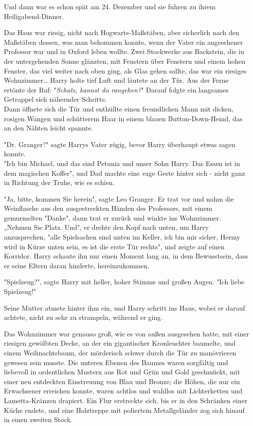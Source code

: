 {Und dann war es schon spät am 24. Dezember und sie fuhren zu ihrem Heiligabend-Dinner.

Das Haus war riesig, nicht nach Hogwarts-Maßstäben, aber sicherlich nach den Maßstäben dessen, was man bekommen konnte, wenn der Vater ein angesehener Professor war und in Oxford leben wollte. Zwei Stockwerke aus Backstein, die in der untergehenden Sonne glänzten, mit Fenstern über Fenstern und einem hohen Fenster, das viel weiter nach oben ging, als Glas gehen sollte, das war ein riesiges Wohnzimmer… Harry holte tief Luft und läutete an der Tür. Aus der Ferne ertönte der Ruf: "\emph{Schatz, kannst du rangehen?}" Darauf folgte ein langsames Getrappel sich nähernder Schritte.\\ Dann öffnete sich die Tür und enthüllte einen freundlichen Mann mit dicken, rosigen Wangen und schütterem Haar in einem blauen Button-Down-Hemd, das an den Nähten leicht spannte.

"Dr. Granger?" sagte Harrys Vater zügig, bevor Harry überhaupt etwas sagen konnte.\\ "Ich bin Michael, und das sind Petunia und unser Sohn Harry. Das Essen ist in dem magischen Koffer", und Dad machte eine vage Geste hinter sich - nicht ganz in Richtung der Truhe, wie es schien.

"Ja, bitte, kommen Sie herein", sagte Leo Granger. Er trat vor und nahm die Weinflasche aus den ausgestreckten Händen des Professors, mit einem gemurmelten "Danke", dann trat er zurück und winkte ins Wohnzimmer. „Nehmen Sie Platz. Und", er drehte den Kopf nach unten, um Harry anzusprechen, "alle Spielsachen sind unten im Keller, ich bin mir sicher, Hermy wird in Kürze unten sein, es ist die erste Tür rechts", und zeigte auf einen Korridor. Harry schaute ihn nur einen Moment lang an, in dem Bewusstsein, dass er seine Eltern daran hinderte, hereinzukommen.

"Spielzeug?", sagte Harry mit heller, hoher Stimme und großen Augen. "Ich liebe Spielzeug!"

Seine Mutter atmete hinter ihm ein, und Harry schritt ins Haus, wobei er darauf achtete, nicht zu sehr zu strampeln, während er ging.

Das Wohnzimmer war genauso groß, wie es von außen ausgesehen hatte, mit einer riesigen gewölbten Decke, an der ein gigantischer Kronleuchter baumelte, und einem Weihnachtsbaum, der mörderisch schwer durch die Tür zu manövrieren gewesen sein musste. Die unteren Ebenen des Baumes waren sorgfältig und liebevoll in ordentlichen Mustern aus Rot und Grün und Gold geschmückt, mit einer neu entdeckten Einstreuung von Blau und Bronze; die Höhen, die nur ein Erwachsener erreichen konnte, waren achtlos und wahllos mit Lichterketten und Lametta-Kränzen drapiert. Ein Flur erstreckte sich, bis er in den Schränken einer Küche endete, und eine Holztreppe mit poliertem Metallgeländer zog sich hinauf in einen zweiten Stock.

}

